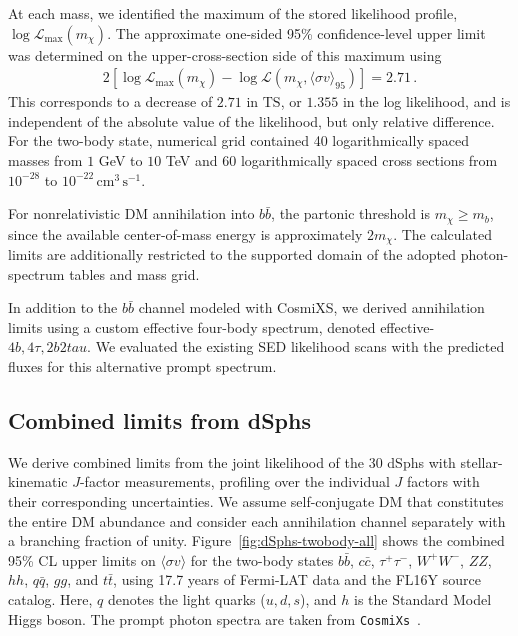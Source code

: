 \documentclass[superscriptaddress,
showpacs,preprintnumbers,nofootinbib,eqsecnum,amsmath,amssymb,aps,11pt, groupedaddress, floatfix]{revtex4-2}
\begin{document}
At each mass, we identified the maximum of the stored likelihood
profile, \(\log\mathcal L_{\max}(m_\chi)\). The approximate
one-sided 95\% confidence-level upper limit was determined on
the upper-cross-section side of this maximum using
\begin{align}
  2\left[
    \log\mathcal L_{\max}(m_\chi)
    -
    \log\mathcal L
    \left(m_\chi,\langle\sigma v\rangle_{95}\right)
  \right]
  =
  2.71\,.
  \label{eq:dm-upper-limit}
\end{align}
This corresponds to a decrease of \(2.71\) in
\(\mathrm{TS}\), or \(1.355\) in the log likelihood,
and is independent of the absolute value of the likelihood, but only relative difference. For the two-body state, numerical grid contained 40 logarithmically spaced masses
from \(1\) GeV to \(10\) TeV and 60 logarithmically spaced cross
sections from \(10^{-28}\) to
\(10^{-22}\,\mathrm{cm^3\,s^{-1}}\).

For nonrelativistic DM annihilation into $b\bar b$, the partonic threshold is
$m_\chi\geq m_b$, since the available center-of-mass energy is approximately $2m_\chi$.
The calculated limits are additionally restricted to the supported domain of the
adopted photon-spectrum tables and mass grid.

In addition to the \(b\bar b\) channel modeled with CosmiXS,
we derived annihilation limits using a custom effective
four-body spectrum, denoted effective-\(4b,4\tau,2b2tau\).
We evaluated the existing SED likelihood scans with the predicted
fluxes for this alternative prompt spectrum.


\subsection{Combined limits from dSphs}
\label{subsec:dSphsBounds}


We derive combined limits from the joint likelihood of the 30 dSphs with stellar-kinematic $J$-factor measurements, profiling over the individual $J$ factors with their
corresponding uncertainties.
We assume self-conjugate DM that constitutes the entire DM abundance and consider each annihilation channel separately with a branching fraction of unity.
Figure~\ref{fig:dSphs-twobody-all} shows the combined 95\% CL
upper limits on $\langle\sigma v\rangle$ for the two-body states $b\bar b$, $c\bar c$, $\tau^+\tau^-$,
$W^+W^-$, $ZZ$, $hh$, $q\bar q$, $gg$, and $t\bar t$,
using 17.7 years of Fermi-LAT data and the FL16Y source catalog.
Here, $q$ denotes the light quarks ($u,d,s$), and $h$ is
the Standard Model Higgs boson. The prompt photon spectra are taken from \texttt{CosmiXs}~\cite{Arina:2023eic}.
\end{document}
